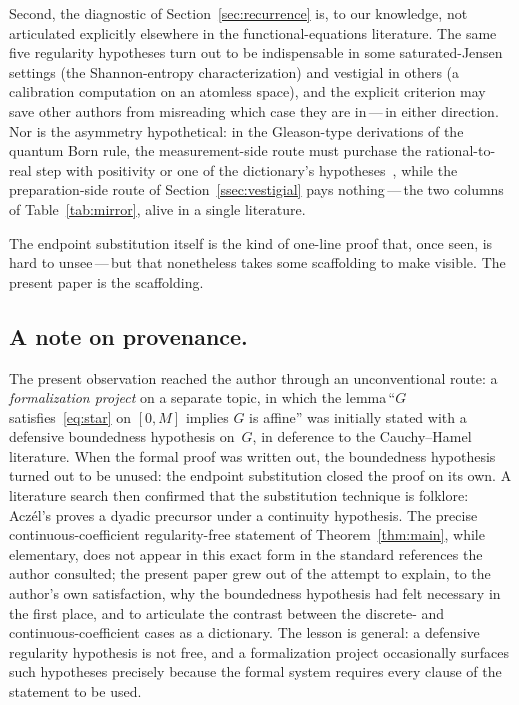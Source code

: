 \documentclass{article}
\theoremstyle{plain}
\theoremstyle{definition}
\begin{document}
Second, the diagnostic of Section~\ref{sec:recurrence} is, to our
knowledge, not articulated explicitly elsewhere in the
functional-equations literature. The same five regularity hypotheses
turn out to be indispensable in some saturated-Jensen settings (the
Shannon-entropy characterization) and vestigial in others (a
calibration computation on an atomless space), and the explicit
criterion may save other authors from misreading which case they are
in\,---\,in either direction. Nor is the asymmetry hypothetical: in
the Gleason-type derivations of the quantum Born rule, the
measurement-side route must purchase the rational-to-real step with
positivity or one of the dictionary's
hypotheses~\cite{Gleason1957,Busch2003,CFMR2004,WrightWeigert2019,WrightWeigert2020},
while the preparation-side route of Section~\ref{ssec:vestigial} pays
nothing\,---\,the two columns of Table~\ref{tab:mirror}, alive in a
single literature.

The endpoint substitution itself is the kind of one-line proof that, once
seen, is hard to unsee\,---\,but that nonetheless takes some scaffolding to
make visible. The present paper is the scaffolding.

\subsection*{A note on provenance.}

The present observation reached the author through an unconventional
route: a \emph{formalization project} on a separate topic, in which the
lemma\,``$G$ satisfies~\eqref{eq:star} on $[0,M]$ implies $G$ is
affine'' was initially stated with a defensive boundedness hypothesis
on~$G$, in deference to the Cauchy--Hamel literature. When the formal
proof was written out, the boundedness hypothesis turned out to be
unused: the endpoint substitution closed the proof on its own.
A literature search then confirmed that the substitution technique is
folklore: Acz\'el's \cite[\S2.1.4]{Aczel1966} proves a dyadic precursor
under a continuity hypothesis. The precise continuous-coefficient
regularity-free statement of Theorem~\ref{thm:main}, while elementary,
does not appear in this exact form in the standard references the
author consulted; the present paper grew out of the attempt to explain,
to the author's own satisfaction, why the boundedness hypothesis had
felt necessary in the first place, and to articulate the contrast
between the discrete- and continuous-coefficient cases as a dictionary.
The lesson is
general: a defensive regularity hypothesis is not free, and a
formalization project occasionally surfaces such hypotheses precisely
because the formal system requires every clause of the statement to be
used.
\end{document}

